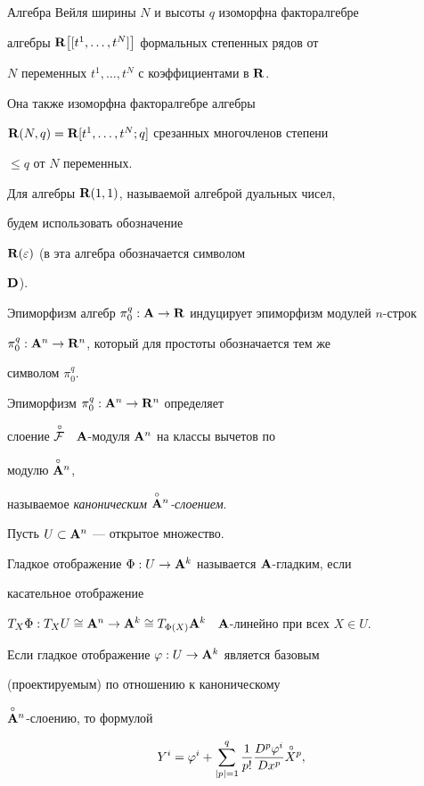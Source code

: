 Алгебра Вейля ширины $N$ и высоты $q$ изоморфна факторалгебре


алгебры ${\bold R}\big[[t^1,\dotsc,t^N]\big]$ формальных степенных рядов от


$N$ переменных  $t^1,\dotsc,t^N$ с коэффициентами в  ${\bold R}$.


Она также изоморфна факторалгебре алгебры


${\bold R}(N,q)={\bold R}[t^1,\dots,t^N;q]$ срезанных многочленов степени


$\le q$ от $N$ переменных.


Для алгебры ${\bold R}(1,1)$, называемой алгеброй дуальных чисел,


будем использовать обозначение


${\bold R}(\varepsilon)$ (в \cite{KMS} эта алгебра обозначается символом


$\bold D$).





Эпиморфизм алгебр ${\pi^q_0}:{\bold A}\to{\bold R}$  индуцирует эпиморфизм модулей $n$-строк


$\pi^q_0:{\bold A}^n\to{\bold R}^n$, который для простоты обозначается тем же


символом $\pi^q_0$.


Эпиморфизм $\pi^q_0:{\bold A}^n\to{\bold R}^n$ определяет


слоение $\overset{\,\circ}{\cal F}{}$ \ ${\bold A}$-модуля ${\bold A}^n$ на классы вычетов по


модулю $\overset{\circ}{\bold A}{}^n$,


называемое {\it каноническим  $\overset{\circ}{\bold A}{}^n$-слоением}.





Пусть $U\subset{\bold A}^n$ --- открытое множество.


Гладкое отображение  $\Phi:U\to{\bold A}^k$ называется ${\bold A}$-гладким, если


касательное отображение


$T_X\Phi:T_XU\cong\A^n\to\A^k\cong


T_{\Phi(X)}\A^k$ \ $\A$-линейно при всех  $X\in U$.


Если гладкое отображение $\varphi:U\to{\bold A}^k$ является базовым


(проектируемым) \cite{Mol} по отношению к каноническому


$\overset{\circ}{\bold A}{}^n$-слоению, то формулой


\begin{equation}


Y^{i}=\varphi^{i}+\sum^q_{|p|=1}\frac{1}{p!}


\frac{D^p\varphi^{i}}{Dx^p}\Xop,


\label{a.1}


\end{equation}


